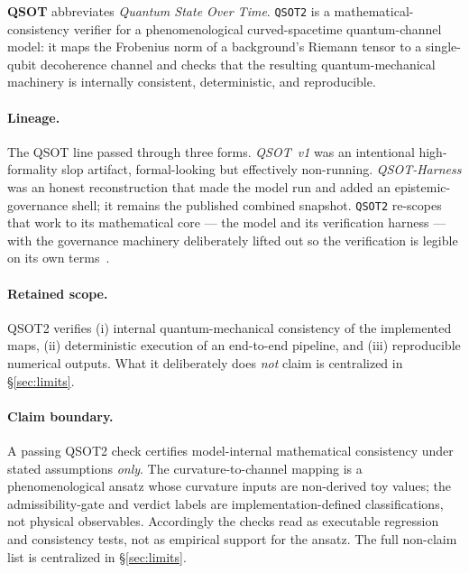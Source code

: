 \textbf{QSOT} abbreviates \emph{Quantum State Over Time}. \texttt{QSOT2} is a
mathematical-consistency verifier for a phenomenological curved-spacetime quantum-channel
model: it maps the Frobenius norm of a background's Riemann tensor to a single-qubit
decoherence channel and checks that the resulting quantum-mechanical machinery is
internally consistent, deterministic, and reproducible.

\paragraph{Lineage.} The QSOT line passed through three forms. \emph{QSOT~v1} was an
intentional high-formality slop artifact, formal-looking but effectively non-running.
\emph{QSOT-Harness} was an honest reconstruction that made the model run and added an
epistemic-governance shell; it remains the published combined snapshot. \texttt{QSOT2}
re-scopes that work to its mathematical core --- the model and its verification harness
--- with the governance machinery deliberately lifted out so the verification is legible
on its own terms~\cite{QSOTHarness2026}.

\paragraph{Retained scope.} QSOT2 verifies (i) internal quantum-mechanical consistency of
the implemented maps, (ii) deterministic execution of an end-to-end pipeline, and (iii)
reproducible numerical outputs. What it deliberately does \emph{not} claim is centralized
in \S\ref{sec:limits}.

\paragraph{Claim boundary.} A passing QSOT2 check certifies model-internal mathematical
consistency under stated assumptions \emph{only}. The curvature-to-channel mapping is a
phenomenological ansatz whose curvature inputs are non-derived toy values; the
admissibility-gate and verdict labels are implementation-defined classifications, not
physical observables. Accordingly the checks read as executable regression and
consistency tests, not as empirical support for the ansatz. The full non-claim list is
centralized in \S\ref{sec:limits}.
